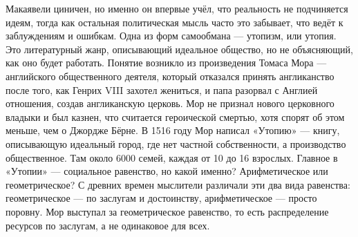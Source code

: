 Макаявели циничен, но именно он впервые учёл, что реальность не подчиняется идеям, тогда как остальная политическая мысль часто это забывает, что ведёт к заблуждениям и ошибкам.
Одна из форм самообмана --- утопизм, или утопия. Это литературный жанр, описывающий идеальное общество, но не объясняющий, как оно будет работать. Понятие возникло из произведения Томаса Мора --- английского общественного деятеля, который отказался принять англиканство после того, как Генрих VIII захотел жениться, и папа разорвал с Англией отношения, создав англиканскую церковь. Мор не признал нового церковного владыки и был казнен, что считается героической смертью, хотя спорят об этом меньше, чем о Джордже Бёрне.
В 1516 году Мор написал «Утопию» --- книгу, описывающую идеальный город, где нет частной собственности, а производство общественное. Там около 6000 семей, каждая от 10 до 16 взрослых. Главное в «Утопии» --- социальное равенство, но какой именно? Арифметическое или геометрическое? С древних времен мыслители различали эти два вида равенства: геометрическое --- по заслугам и достоинству, арифметическое --- просто поровну. Мор выступал за геометрическое равенство, то есть распределение ресурсов по заслугам, а не одинаковое для всех.
